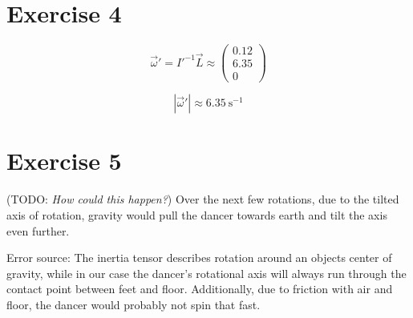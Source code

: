 \documentclass[10pt,DIV10,a4paper]{scrartcl}
\begin{document}
\section*{Exercise 4}

$$\vec{\omega}' = I'^{-1}\vec{L} \approx \left(\begin{array}{r}
0.12\\
6.35\\
0
\end{array}\right)$$

$$|\vec{\omega}'| \approx 6.35\ \text{s}^{-1}$$

\section*{Exercise 5}

(TODO: \textit{How could this happen?}) Over the next few rotations, due to the tilted axis of rotation, gravity would pull the dancer towards earth and tilt the axis even further.

Error source: The inertia tensor describes rotation around an objects center of gravity, while in our case the dancer's rotational axis will always run through the contact point between feet and floor. Additionally, due to friction with air and floor, the dancer would probably not spin that fast.
\end{document}
